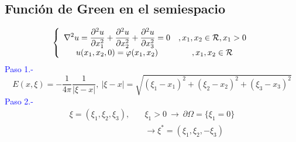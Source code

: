 \documentclass[../main]{subfiles}
\begin{document}
    \subsection{Función de Green en el semiespacio}
    \begin{equation}
        \begin{split}
            \left\{
            \begin{array}{cc}
              \displaystyle \nabla^2 u=\pdv{^2 u}{x_1^2}+\pdv{^2 u}{x_2^2}+\pdv{^2 u}{x^2_3}=0   & , x_1,x_2 \in \mathcal{R}, x_1>0 \\
              \displaystyle u(x_1, x_2, 0)=\varphi(x_1, x_2)   & , x_1, x_2 \in \mathcal{R}
            \end{array}
            \right.
        \end{split}
    \end{equation}
    \textcolor{blue}{Paso 1.-}
    \begin{equation}
        E(x,\xi)=-\dfrac{1}{4\pi} \dfrac{1}{|\xi-x|}, \ |\xi-x|=\sqrt{(\xi_1-x_1)^2+(\xi_2-x_2)^2+(\xi_3-x_3)^2}
    \end{equation}
    \textcolor{blue}{Paso 2.-}
    \begin{align}
        \xi=(\xi_1,\xi_2,\xi_3), \quad &\xi_1>0 \ \rightarrow \ \partial \Omega=\{\xi_1=0\} \\
        &\rightarrow \xi^*=(\xi_1,\xi_2,-\xi_3)
    \end{align}
\end{document}
